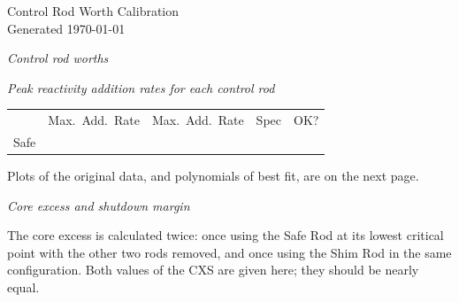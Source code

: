 \documentclass[12pt]{article}
\begin{document}
\begin{center}
\large Control Rod Worth Calibration \\
\normalsize Generated \today
\end{center}

\emph{Control rod worths}


\emph{Peak reactivity addition rates for each control rod}

\begin{tabular}{r c c c c}
	& Max.\ Add.\ Rate & Max.\ Add.\ Rate & Spec & OK? \\
	Safe & \textbf{%
	Shim & \textbf{%
	Reg & \textbf{%
\end{tabular}

Plots of the original data, and polynomials of best fit, are on the next page.

\emph{Core excess and shutdown margin}

The core excess is calculated twice: once using the Safe Rod at its lowest critical point with the other two rods removed, and once using the Shim Rod in the same configuration. Both values of the CXS are given here; they should be nearly equal.
\end{document}

